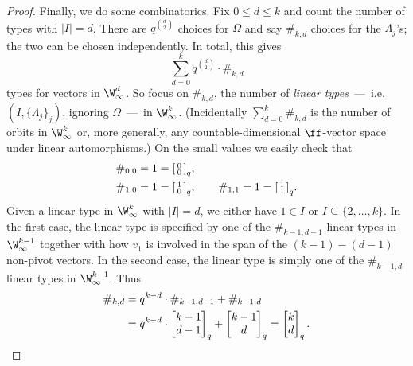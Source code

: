 \begin{proof}
    Finally, we do some combinatorics.
    Fix $0 \leq d \leq k$ and count the number of types with $|I| = d$.
    There are $q^{\binom{d}{2}}$ choices for $\Omega$ and say $\#_{k, d}$ choices for the $\Lambda_j$'s;
    the two can be chosen independently.
    In total, this gives
    \[
        \sum_{d=0}^k q^{\binom{d}{2}} \cdot \#_{k, d} 
    \]
    types for vectors in $\W_\infty^d$.
    So focus on $\#_{k, d}$, the number of \emph{linear types}~---~i.e.~$(I, \{\Lambda_j\}_j)$, ignoring $\Omega$~---~in $\W_\infty^k$.
    (Incidentally $\sum_{d=0}^k \#_{k, d}$ is the number of orbits in $\W_\infty^k$ or, more generally, any countable-dimensional $\ff$-vector space under linear automorphisms.)
    On the small values we easily check that \begin{align*}
        &\#_{0, 0} = 1 = \begin{bsmallmatrix}0 \\ 0\end{bsmallmatrix}_q, \\
        &\#_{1, 0} = 1 = \begin{bsmallmatrix}1 \\ 0\end{bsmallmatrix}_q,\qquad
        \#_{1, 1} = 1 = \begin{bsmallmatrix}1 \\ 1\end{bsmallmatrix}_q.
    \end{align*}
    Given a linear type in $\W_\infty^k$ with $\vert I \vert = d$, 
    we either have $1 \in I$ or $I \subseteq \{2, \ldots, k\}$.
    In the first case, the linear type is specified by one of the $\#_{k-1, d-1}$ linear types in $\W_\infty^{k-1}$
    together with how $v_1$ is involved in the span of the $(k - 1) - (d - 1)$ non-pivot vectors.
    In the second case, the linear type is simply one of the $\#_{k-1, d}$ linear types in $\W_\infty^{k-1}$.
    Thus 
    \begin{align*}
        \#_{k, d} 
        &= q^{k-d} \cdot \#_{k-1, d-1} + \#_{k-1, d} \\
        &= q^{k-d} \cdot \begin{bmatrix}k-1 \\ d-1\end{bmatrix}_q + \begin{bmatrix}k-1 \\ d\end{bmatrix}_q
        = \begin{bmatrix}k \\ d\end{bmatrix}_q.
        \qedhere
    \end{align*}
\end{proof}

